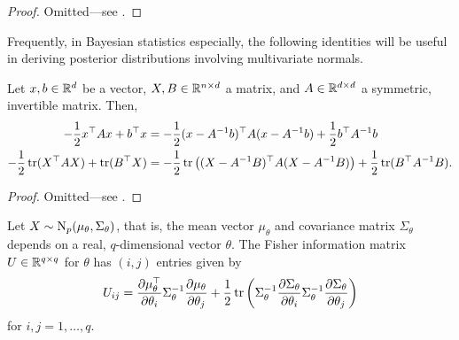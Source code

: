 \begin{proof}
  Omitted---see \citet[sec. 8]{petersen2008matrix}.
\end{proof}

Frequently, in Bayesian statistics especially, the following identities will be useful in deriving posterior distributions involving multivariate normals.

\begin{lemma}\label{apx:fishermultinormal}
  Let $x,b\in\mathbb{R}^d$ be a vector, $X,B\in\mathbb{R}^{n\times d}$ a matrix, and $A \in \mathbb{R}^{d \times d}$ a symmetric, invertible matrix.
  Then,
  \begin{align*}
    -\frac{1}{2} x^\top A x + b^\top x 
    &= -\frac{1}{2} (x - A^{-1}b)^\top A (x - A^{-1}b) + \frac{1}{2} b^\top A^{-1} b \\
    -\frac{1}{2} \operatorname{tr} (X^\top A X) + \operatorname{tr}(B^\top X)
    &= -\frac{1}{2} \operatorname{tr}\big((X - A^{-1}B)^\top A(X - A^{-1}B) \big) + \frac{1}{2}\operatorname{tr}(B^\top A^{-1} B).
  \end{align*}
\end{lemma}

\begin{proof}
  Omitted---see \citet[sec. 8.1.6]{petersen2008matrix}.
\end{proof}

\newcommand{\dSi}{\frac{\partial\Sigma_\theta}{\partial \theta_i}}
\newcommand{\dSinv}{\frac{\partial\Sigma_\theta^{-1}}{\partial \theta_i}}
\newcommand{\dSj}{\frac{\partial\Sigma_\theta}{\partial \theta_j}}
\newcommand{\dSjnv}{\frac{\partial\Sigma_\theta^{-1}}{\partial \theta_j}}
\newcommand{\dStwo}{\frac{\partial^2\Sigma_\theta}{\partial \theta_i\theta_j}}
\newcommand{\Xmu}{(X - \mu_\theta)}
\newcommand{\dmui}{\frac{\partial\mu_\theta}{\partial\theta_i}}
\newcommand{\dmuj}{\frac{\partial\mu_\theta}{\partial\theta_j}}
\newcommand{\dmuitop}{\frac{\partial\mu_\theta^\top}{\partial\theta_i}}
\newcommand{\dmujtop}{\frac{\partial\mu_\theta^\top}{\partial\theta_j}}
\newcommand{\dmutwo}{\frac{\partial^2\mu_\theta}{\partial\theta_i\partial\theta_j}}


\begin{lemma}
  Let $X\sim\operatorname{N}_p(\mu_\theta,\Sigma_\theta)$, that is, the mean vector $\mu_\theta$ and covariance matrix $\Sigma_\theta$ depends on a real, $q$-dimensional vector $\theta$.
  The Fisher information matrix $U \in \mathbb{R}^{q\times q}$ for $\theta$ has $(i,j)$ entries given by
  \begin{equation}
    U_{ij} = \dmuitop \Sigma_\theta^{-1} \dmuj + \half \tr \left(\Sigma_\theta^{-1} \dSi \Sigma_\theta^{-1} \dSj \right)
  \end{equation}
  for $i,j=1,\dots,q$.
\end{lemma}


